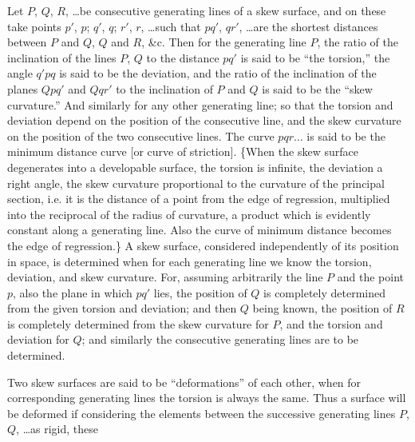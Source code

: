 \documentclass[11pt]{article}
\begin{document}
\bigskip

Let $P$, $Q$, $R$, \ldots be consecutive generating lines of a skew surface, and on these
take points $p'$, $p$; $q'$, $q$; $r'$, $r$, \ldots such that $pq'$, $qr'$, \ldots are the
shortest distances between $P$ and $Q$, $Q$ and $R$, \&c. Then for the generating line
$P$, the ratio of the inclination of the lines $P$, $Q$ to the distance $pq'$ is said to be
``the torsion,'' the angle $q'pq$ is said to be the deviation, and the ratio of the
inclination of the planes $Qpq'$ and $Qqr'$ to the inclination of $P$ and $Q$ is said to
be the ``skew curvature.'' And similarly for any other generating line; so that the
torsion and deviation depend on the position of the consecutive line, and the skew
curvature on the position of the two consecutive lines. The curve $pqr\ldots$ is said to
be the minimum distance curve [or curve of striction]. \{When the skew surface
degenerates into a developable surface, the torsion is infinite, the deviation a right
angle, the skew curvature proportional to the curvature of the principal section, i.e. it
is the distance of a point from the edge of regression, multiplied into the reciprocal of
the radius of curvature, a product which is evidently constant along a generating line.
Also the curve of minimum distance becomes the edge of regression.\} A skew surface,
considered independently of its position in space, is determined when for each generating
line we know the torsion, deviation, and skew curvature. For, assuming arbitrarily the
line $P$ and the point $p$, also the plane in which $pq'$ lies, the position of $Q$ is
completely determined from the given torsion and deviation; and then $Q$ being known,
the position of $R$ is completely determined from the skew curvature for $P$, and the
torsion and deviation for $Q$; and similarly the consecutive generating lines are to be
determined.

Two skew surfaces are said to be ``deformations'' of each other, when for corresponding
generating lines the torsion is always the same. Thus a surface will be deformed if
considering the elements between the successive generating lines $P$, $Q$, \ldots as
rigid, these

\newpage
\setcounter{page}{235}
\end{document}
